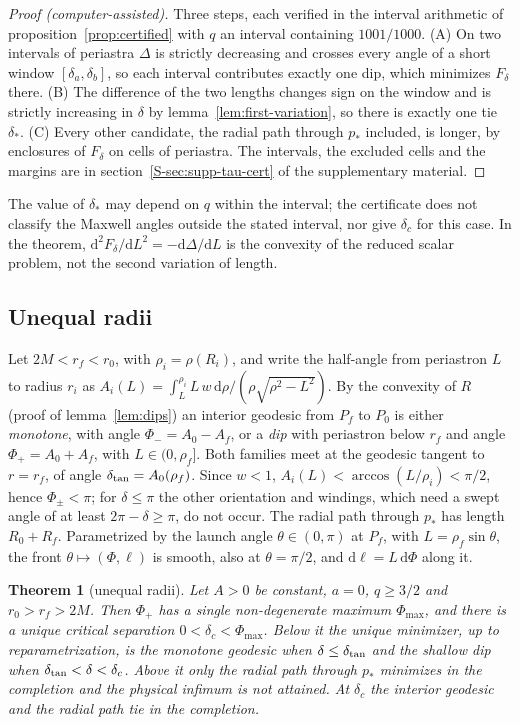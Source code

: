 \documentclass[aip,jmp,amsmath,amssymb,reprint]{revtex4-2}
\newcommand{\dd}{\mathrm{d}}
\theoremstyle{plain}
\newtheorem{theorem}{Theorem}
\theoremstyle{definition}
\begin{document}
\begin{proof}[Proof (computer-assisted)]
Three steps, each verified in the interval arithmetic of proposition~\ref{prop:certified} with $q$ an interval
containing $1001/1000$. (A) On two intervals of periastra $\Delta$ is strictly decreasing and crosses every angle
of a short window $[\delta_a,\delta_b]$, so each interval contributes exactly one dip, which minimizes $F_\delta$
there. (B) The difference of the two lengths changes sign on the window and is strictly increasing in $\delta$
by lemma~\ref{lem:first-variation}, so there is exactly one tie $\delta_*$. (C) Every other candidate, the radial
path through $p_*$ included, is longer, by enclosures of $F_\delta$ on cells of periastra. The intervals, the
excluded cells and the margins are in section~\ref{S-sec:supp-tau-cert} of the supplementary material.
\end{proof}

The value of $\delta_*$ may depend on $q$ within the interval; the certificate does not
classify the Maxwell angles outside the stated interval, nor give $\delta_c$ for this case.
In the theorem, $\dd^2F_\delta/\dd L^2=-\dd\Delta/\dd L$ is the convexity of the reduced scalar
problem, not the second variation of length.

\subsection{Unequal radii}
Let $2M<r_f<r_0$, with $\rho_i=\rho(R_i)$, and write the half-angle from periastron $L$ to
radius $r_i$ as $A_i(L)=\int_L^{\rho_i}L\,w\,\dd\rho/(\rho\sqrt{\rho^2-L^2})$. By the convexity of
$R$ (proof of lemma~\ref{lem:dips}) an interior geodesic from $P_f$ to $P_0$ is either
\emph{monotone}, with angle $\Phi_-=A_0-A_f$, or a \emph{dip} with periastron below $r_f$ and
angle $\Phi_+=A_0+A_f$, with $L\in(0,\rho_f]$. Both families meet at the geodesic tangent to $r=r_f$, of angle $\delta_{\rm tan}=A_0(\rho_f)$.
Since $w<1$, $A_i(L)<\arccos(L/\rho_i)<\pi/2$, hence $\Phi_\pm<\pi$; for $\delta\le\pi$ the other orientation
and windings, which need a swept angle of at least $2\pi-\delta\ge\pi$, do not occur. The radial path through
$p_*$ has length $R_0+R_f$. Parametrized by the launch angle $\theta\in(0,\pi)$ at $P_f$, with
$L=\rho_f\sin\theta$, the front $\theta\mapsto(\Phi,\ell)$ is smooth, also at $\theta=\pi/2$, and
$\dd\ell=L\,\dd\Phi$ along it.

\begin{theorem}[unequal radii]\label{thm:unequal}
Let $A>0$ be constant, $a=0$, $q\ge3/2$ and $r_0>r_f>2M$. Then $\Phi_+$ has a single
non-degenerate maximum $\Phi_{\max}$, and there is a unique critical separation
$0<\delta_c<\Phi_{\max}$. Below it the unique minimizer, up to reparametrization, is the
monotone geodesic when $\delta\le\delta_{\rm tan}$ and the shallow dip when
$\delta_{\rm tan}<\delta<\delta_c$. Above it only the radial path through $p_*$ minimizes in the
completion and the physical infimum is not attained. At $\delta_c$ the interior geodesic and the
radial path tie in the completion.
\end{theorem}
\end{document}
